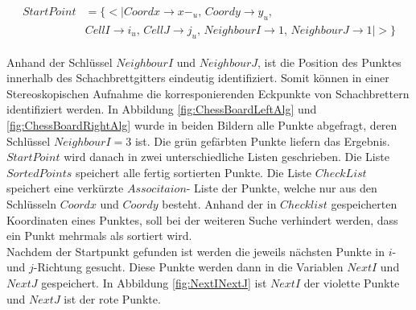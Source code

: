 %

\begin{gather*}
	\begin{split}
			StartPoint &= \{ <|Coordx \rightarrow x-_u,\, Coordy \rightarrow y_u,\, \\
			&CellI \rightarrow i_u,\, CellJ \rightarrow j_u,\,
			NeighbourI \rightarrow 1, \,NeighbourJ \rightarrow 1 |>\}
	\end{split}
\end{gather*}
 
Anhand der Schlüssel $NeighbourI$ und $NeighbourJ$, ist die Position des Punktes innerhalb des Schachbrettgitters eindeutig identifiziert. Somit können in einer Stereoskopischen Aufnahme die korresponierenden Eckpunkte von Schachbrettern identifiziert werden. In Abbildung \ref{fig:ChessBoardLeftAlg} und \ref{fig:ChessBoardRightAlg} wurde in beiden Bildern alle Punkte abgefragt, deren Schlüssel $NeighbourI = 3$ ist. Die grün gefärbten Punkte liefern das Ergebnis. \\

$StartPoint$ wird danach in zwei unterschiedliche Listen geschrieben. Die Liste $SortedPoints$ speichert alle fertig sortierten Punkte. Die Liste $CheckList$ speichert eine verkürzte $Associtaion$- Liste der Punkte, welche nur aus den Schlüsseln $Coordx$ und $Coordy$ besteht. Anhand der in $Checklist$ gespeicherten Koordinaten eines Punktes, soll bei der weiteren Suche verhindert werden, dass ein Punkt mehrmals als sortiert wird.\\



%
% 
Nachdem der Startpunkt gefunden ist werden die jeweils nächsten Punkte in $i$- und $j$-Richtung gesucht. Diese Punkte werden dann in die Variablen $NextI$ und $NextJ$ gespeichert. In Abbildung \ref{fig:NextINextJ} ist $NextI$ der violette Punkte und $NextJ$ ist der rote Punkte. \\

